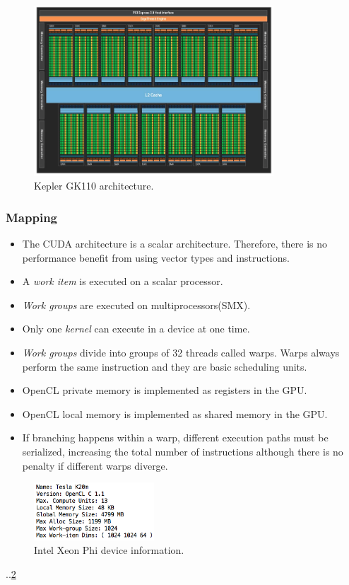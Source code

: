 \begin{figure}[!h]
    \centering
    \includegraphics[width=0.8\textwidth]{figures/gpu_arch.png}
    \caption{Kepler GK110 architecture\cite{gpu_specs1}.}
    \label{GpuArch}
\end{figure}

\subsubsection{Mapping}
\begin{itemize}
    \item The CUDA architecture is a scalar architecture. Therefore, there is no performance benefit from using vector types and 
        instructions\cite{gpu_opencl_cuda}.
    \item A \emph{work item} is executed on a scalar processor\cite{gpu_opencl_opt_slides}.
    \item \emph{Work groups} are executed on multiprocessors(SMX)\cite{gpu_opencl_opt_slides}.
    \item Only one \emph{kernel} can execute in a device at one time\cite{gpu_opencl_opt_slides}.
    \item \emph{Work groups} divide into groups of 32 threads called warps. Warps always perform the same instruction and they
        are basic scheduling units\cite{gpu_opencl_opt_slides}.
    \item OpenCL private memory is implemented as registers in the GPU\cite{gpu_opencl_opt_slides}.
    \item OpenCL local memory is implemented as shared memory in the GPU\cite{gpu_opencl_opt_slides}.
    \item If branching happens within a warp, different execution paths must be serialized, increasing the total number of 
        instructions although there is no penalty if different warps diverge\cite{gpu_opencl_opt_slides}.
\end{itemize}

\begin{figure}[!h]
    \centering
    \includegraphics[width=0.4\textwidth]{figures/gpu_device_info.png}
    \caption{Intel Xeon Phi device information.}
    \label{GpuDeviceInfo}
\end{figure}

\par{..\cite{gpu_specs1}\ref{GpuDeviceInfo}\cite{gpu_opencl_cuda}}




